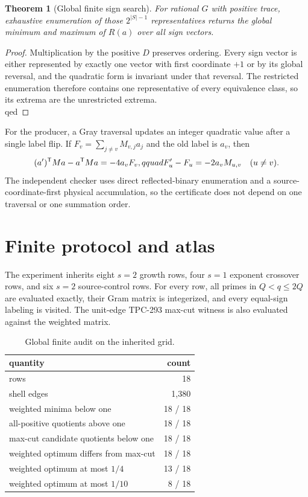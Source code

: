 \documentclass[10pt]{article}
\newtheorem{theorem}{Theorem}
\begin{document}
\begin{theorem}[Global finite sign search]
For rational $G$ with positive trace, exhaustive enumeration of those
$2^{|S|-1}$ representatives returns the global minimum and maximum of
$R(a)$ over all sign vectors.
\end{theorem}

\begin{proof}
Multiplication by the positive $D$ preserves ordering.  Every sign vector is
either represented by exactly one vector with first coordinate $+1$ or by its
global reversal, and the quadratic form is invariant under that reversal.
The restricted enumeration therefore contains one representative of every
equivalence class, so its extrema are the unrestricted extrema. \\qed
\end{proof}

For the producer, a Gray traversal updates an integer quadratic value after a
single label flip.  If
$F_v=\sum_{j\ne v}M_{v,j}a_j$ and the old label is $a_v$, then
\[
 (a')^{\mathsf T}Ma-a^{\mathsf T}Ma=-4a_vF_v,\\qquad
 F'_u-F_u=-2a_vM_{u,v}\quad(u\ne v).
 \label{eq:gray}
\]
The independent checker uses direct reflected-binary enumeration and a
source-coordinate-first physical accumulation, so the certificate does not
depend on one traversal or one summation order.

\section{Finite protocol and atlas}

The experiment inherits eight $s=2$ growth rows, four $s=1$ exponent
crossover rows, and six $s=2$ source-control rows.  For every row, all primes
in $Q<q\le2Q$ are evaluated exactly, their Gram matrix is integerized, and
every equal-sign labeling is visited.  The unit-edge TPC-293 max-cut witness
is also evaluated against the weighted matrix.

\begin{table}[ht]
\centering
\small
\caption{Global finite audit on the inherited grid.}
\label{tab:global}
\begin{tabular}{@{}lr@{}}
\toprule
quantity & count\\
\midrule
rows & 18\\
shell edges & 1,380\\
weighted minima below one & 18 / 18\\
all-positive quotients above one & 18 / 18\\
max-cut candidate quotients below one & 18 / 18\\
weighted optimum differs from max-cut & 18 / 18\\
weighted optimum at most $1/4$ & 13 / 18\\
weighted optimum at most $1/10$ & 8 / 18\\
\bottomrule
\end{tabular}
\end{table}
\end{document}
